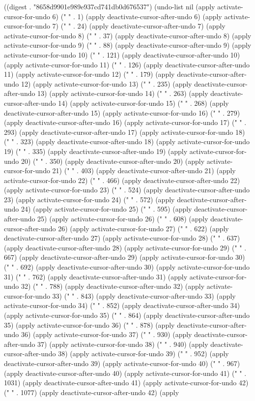 
((digest . "8658d9901e989e937cd741db0d676537") (undo-list nil (apply activate-cursor-for-undo 6) (" " . 1) (apply deactivate-cursor-after-undo 6) (apply activate-cursor-for-undo 7) (" " . 24) (apply deactivate-cursor-after-undo 7) (apply activate-cursor-for-undo 8) (" " . 37) (apply deactivate-cursor-after-undo 8) (apply activate-cursor-for-undo 9) (" " . 88) (apply deactivate-cursor-after-undo 9) (apply activate-cursor-for-undo 10) (" " . 121) (apply deactivate-cursor-after-undo 10) (apply activate-cursor-for-undo 11) (" " . 126) (apply deactivate-cursor-after-undo 11) (apply activate-cursor-for-undo 12) (" " . 179) (apply deactivate-cursor-after-undo 12) (apply activate-cursor-for-undo 13) (" " . 235) (apply deactivate-cursor-after-undo 13) (apply activate-cursor-for-undo 14) (" " . 263) (apply deactivate-cursor-after-undo 14) (apply activate-cursor-for-undo 15) (" " . 268) (apply deactivate-cursor-after-undo 15) (apply activate-cursor-for-undo 16) (" " . 279) (apply deactivate-cursor-after-undo 16) (apply activate-cursor-for-undo 17) (" " . 293) (apply deactivate-cursor-after-undo 17) (apply activate-cursor-for-undo 18) (" " . 323) (apply deactivate-cursor-after-undo 18) (apply activate-cursor-for-undo 19) (" " . 335) (apply deactivate-cursor-after-undo 19) (apply activate-cursor-for-undo 20) (" " . 350) (apply deactivate-cursor-after-undo 20) (apply activate-cursor-for-undo 21) (" " . 403) (apply deactivate-cursor-after-undo 21) (apply activate-cursor-for-undo 22) (" " . 466) (apply deactivate-cursor-after-undo 22) (apply activate-cursor-for-undo 23) (" " . 524) (apply deactivate-cursor-after-undo 23) (apply activate-cursor-for-undo 24) (" " . 572) (apply deactivate-cursor-after-undo 24) (apply activate-cursor-for-undo 25) (" " . 595) (apply deactivate-cursor-after-undo 25) (apply activate-cursor-for-undo 26) (" " . 608) (apply deactivate-cursor-after-undo 26) (apply activate-cursor-for-undo 27) (" " . 622) (apply deactivate-cursor-after-undo 27) (apply activate-cursor-for-undo 28) (" " . 637) (apply deactivate-cursor-after-undo 28) (apply activate-cursor-for-undo 29) (" " . 667) (apply deactivate-cursor-after-undo 29) (apply activate-cursor-for-undo 30) (" " . 692) (apply deactivate-cursor-after-undo 30) (apply activate-cursor-for-undo 31) (" " . 762) (apply deactivate-cursor-after-undo 31) (apply activate-cursor-for-undo 32) (" " . 788) (apply deactivate-cursor-after-undo 32) (apply activate-cursor-for-undo 33) (" " . 843) (apply deactivate-cursor-after-undo 33) (apply activate-cursor-for-undo 34) (" " . 852) (apply deactivate-cursor-after-undo 34) (apply activate-cursor-for-undo 35) (" " . 864) (apply deactivate-cursor-after-undo 35) (apply activate-cursor-for-undo 36) (" " . 878) (apply deactivate-cursor-after-undo 36) (apply activate-cursor-for-undo 37) (" " . 930) (apply deactivate-cursor-after-undo 37) (apply activate-cursor-for-undo 38) (" " . 940) (apply deactivate-cursor-after-undo 38) (apply activate-cursor-for-undo 39) (" " . 952) (apply deactivate-cursor-after-undo 39) (apply activate-cursor-for-undo 40) (" " . 967) (apply deactivate-cursor-after-undo 40) (apply activate-cursor-for-undo 41) (" " . 1031) (apply deactivate-cursor-after-undo 41) (apply activate-cursor-for-undo 42) (" " . 1077) (apply deactivate-cursor-after-undo 42) (apply 